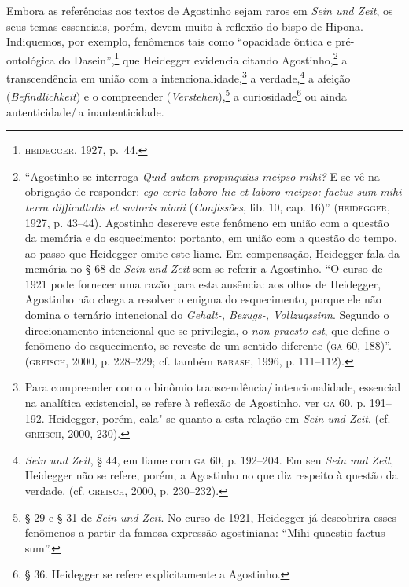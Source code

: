 Embora as referências aos textos de Agostinho sejam raros em
\emph{Sein und Zeit}, os seus temas essenciais, porém, devem
muito à reflexão do bispo de Hipona. Indiquemos, por exemplo,
fenômenos tais como “opacidade ôntica e pré-ontológica do
Dasein”,\footnote{ \textsc{heidegger}, 1927, p.~44.} que Heidegger
evidencia citando Agostinho,\footnote{  “Agostinho se
interroga \emph{Quid autem propinquius meipso mihi?} E se vê
na obrigação de responder: \emph{ego certe laboro hic et
laboro meipso: factus sum mihi terra difficultatis et sudoris
nimii} (\emph{Confissões}, lib. 10, cap. 16)” (\textsc{heidegger}, 1927,
p. 43--44). Agostinho descreve este fenômeno em união com a
questão da memória e do esquecimento; portanto, em união com a
questão do tempo, ao passo que Heidegger omite este liame. Em
compensação, Heidegger fala da memória no § 68 de \emph{Sein
und Zeit} sem se referir a Agostinho. “O curso de 1921 pode
fornecer uma razão para esta ausência: aos olhos de Heidegger,
Agostinho não chega a resolver o enigma do esquecimento, porque
ele não domina o ternário intencional do \emph{Gehalt-,
Bezugs-, Vollzugssinn}. Segundo o direcionamento intencional que
se privilegia, o \emph{non praesto} \emph{est}, que define o
fenômeno do esquecimento, se reveste de um sentido diferente
(\textsc{ga}
60, 188)”. (\textsc{greisch}, 2000, p. 228--229; cf. também
\textsc{barash}, 1996, p.
111--112).} a transcendência em união com a
intencionalidade,\footnote{   Para compreender como o binômio
transcendência/\,intencionalidade, essencial na analítica
existencial, se refere à reflexão de Agostinho, ver \textsc{ga} 60, p.
191--192. Heidegger, porém, cala"-se quanto a esta relação em
\emph{Sein und Zeit}. (cf. \textsc{greisch}, 2000, 230).} a
verdade,\footnote{   \emph{Sein und Zeit}, § 44, em liame
com \textsc{ga} 60, p. 192--204. Em seu \emph{Sein und Zeit},  Heidegger
não se refere, porém, a Agostinho no que diz respeito à questão
da verdade. (cf. \textsc{greisch}, 2000, p. 230--232).} a afeição
(\emph{Befindlichkeit}) e o compreender
(\emph{Verstehen}),\footnote{   § 29 e § 31 de \emph{Sein
und Zeit}. No curso de 1921, Heidegger já descobrira esses
fenômenos a partir da famosa expressão agostiniana: “Mihi
quaestio factus sum”.} a curiosidade\footnote{   § 36.
Heidegger se refere explicitamente a Agostinho.} ou ainda
autenticidade/\,a inautenticidade.

